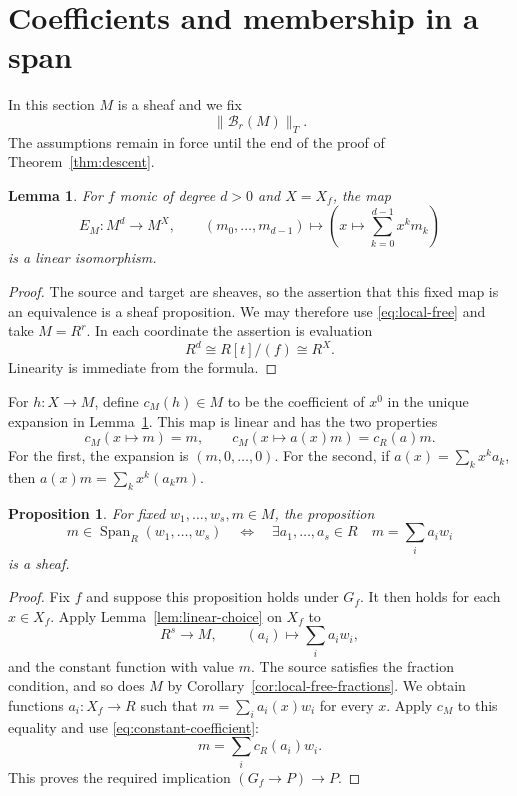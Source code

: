 \documentclass[11pt]{amsart}
\newtheorem{lemma}[theorem]{Lemma}
\newtheorem{proposition}[theorem]{Proposition}
\theoremstyle{definition}
\newcommand{\Bas}{\mathcal B}
\newcommand{\loc}[1]{\lVert #1\rVert_T}
\newcommand{\Span}{\operatorname{Span}}
\begin{document}
\section{Coefficients and membership in a span}

In this section $M$ is a sheaf and we fix
\begin{equation}\label{eq:local-free}
 \loc{\Bas_r(M)}.
\end{equation}
The assumptions remain in force until the end of the proof of
Theorem~\ref{thm:descent}.

\begin{lemma}\label{lem:coefficients}
For $f$ monic of degree $d>0$ and $X=X_f$, the map
\[
 E_M:M^d\longrightarrow M^X,\qquad
 (m_0,\ldots,m_{d-1})\longmapsto
 \left(x\longmapsto\sum_{k=0}^{d-1}x^k m_k\right)
\]
is a linear isomorphism.
\end{lemma}
\begin{proof}
The source and target are sheaves, so the assertion that this fixed map
is an equivalence is a sheaf proposition. We may therefore use
\eqref{eq:local-free} and take $M=R^r$. In each coordinate the assertion
is evaluation
\[
 R^d\cong R[t]/(f)\cong R^X.
\]
Linearity is immediate from the formula.
\end{proof}

For $h:X\to M$, define $c_M(h)\in M$ to be the coefficient of $x^0$ in
the unique expansion in Lemma~\ref{lem:coefficients}. This map is linear
and has the two properties
\begin{equation}\label{eq:constant-coefficient}
 c_M(x\mapsto m)=m,\qquad
 c_M(x\mapsto a(x)m)=c_R(a)m.
\end{equation}
For the first, the expansion is $(m,0,\ldots,0)$. For the second, if
$a(x)=\sum_k x^ka_k$, then $a(x)m=\sum_k x^k(a_km)$.

\begin{proposition}\label{prop:span}
For fixed $w_1,\ldots,w_s,m\in M$, the proposition
\[
 m\in\Span_R(w_1,\ldots,w_s)
 \quad\Longleftrightarrow\quad
 \exists a_1,\ldots,a_s\in R\quad m=\sum_i a_iw_i
\]
is a sheaf.
\end{proposition}
\begin{proof}
Fix $f$ and suppose this proposition holds under $G_f$. It then holds
for each $x\in X_f$. Apply Lemma~\ref{lem:linear-choice} on $X_f$ to
\[
 R^s\longrightarrow M,\qquad(a_i)\longmapsto\sum_i a_iw_i,
\]
and the constant function with value $m$. The source satisfies the
fraction condition, and so does $M$ by
Corollary~\ref{cor:local-free-fractions}.
We obtain functions $a_i:X_f\to R$ such that
$m=\sum_i a_i(x)w_i$ for every $x$. Apply $c_M$ to this equality and
use \eqref{eq:constant-coefficient}:
\[
 m=\sum_i c_R(a_i)w_i.
\]
This proves the required implication $(G_f\to P)\to P$.
\end{proof}
\end{document}
